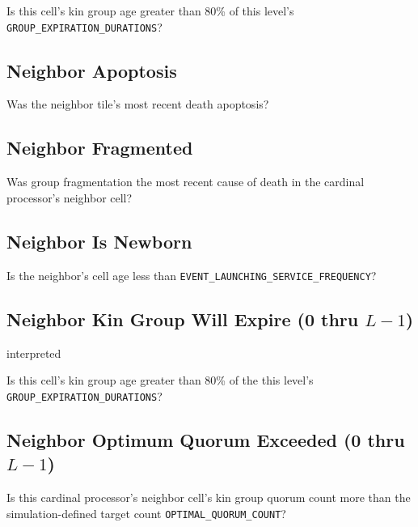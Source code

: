 
Is this cell's kin group age greater than 80\% of this level's \texttt{GROUP\_EXPIRATION\_DURATIONS}?

\subsection{Neighbor Apoptosis}

Was the neighbor tile's most recent death apoptosis?


\subsection{Neighbor Fragmented}

Was group fragmentation the most recent cause of death in the cardinal processor's neighbor cell?


\subsection{Neighbor Is Newborn}


Is the neighbor's cell age less than \texttt{EVENT\_LAUNCHING\_SERVICE\_FREQUENCY}?

\subsection{Neighbor Kin Group Will Expire (0 thru $L-1$)}{interpreted}


Is this cell's kin group age greater than 80\% of the this level's \texttt{GROUP\_EXPIRATION\_DURATIONS}?

\subsection{Neighbor Optimum Quorum Exceeded (0 thru $L-1$)}


Is this cardinal processor's neighbor cell's kin group quorum count more than the simulation-defined target count \texttt{OPTIMAL\_QUORUM\_COUNT}?

